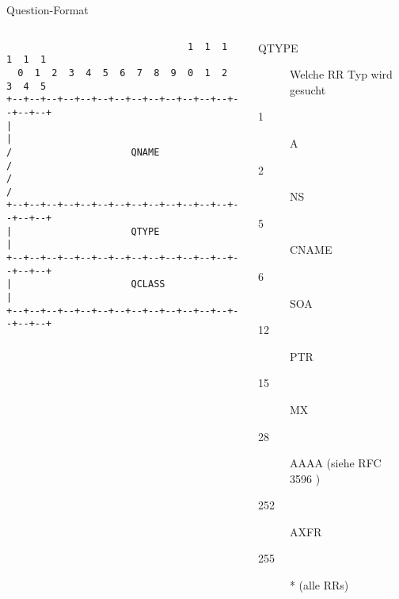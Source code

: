 \documentclass{beamer}
\begin{document}
  \begin{frame}[fragile]{\mytitle}{Question-Format}
    \begin{columns}[c]
      \column{5cm}
      \tiny{
        \begin{verbatim}
                                1  1  1  1  1  1
  0  1  2  3  4  5  6  7  8  9  0  1  2  3  4  5
+--+--+--+--+--+--+--+--+--+--+--+--+--+--+--+--+
|                                               |
/                     QNAME                     /
/                                               /
+--+--+--+--+--+--+--+--+--+--+--+--+--+--+--+--+
|                     QTYPE                     |
+--+--+--+--+--+--+--+--+--+--+--+--+--+--+--+--+
|                     QCLASS                    |
+--+--+--+--+--+--+--+--+--+--+--+--+--+--+--+--+
        \end{verbatim}
      }
      \column{7cm}
        \footnotesize{
       \begin{description}
          \item[QTYPE] Welche RR Typ wird gesucht
          \item[1] A
          \item[2] NS
          \item[5] CNAME
          \item[6] SOA
          \item[12] PTR
          \item[15] MX
          \item[28] AAAA (siehe RFC 3596 \cite{rfc3596})
          \item[252] AXFR
          \item[255] * (alle RRs)
        \end{description}
      }
    \end{columns}
\end{frame}
\end{document}
